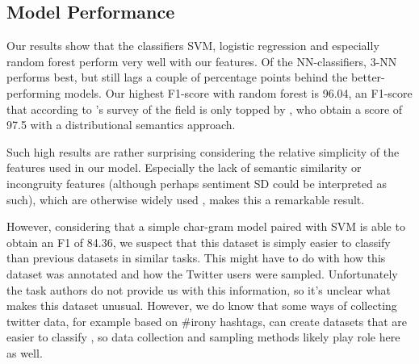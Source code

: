 \subsection{Model Performance}

Our results show that the classifiers SVM, logistic regression and especially random forest perform very well with our features. Of the NN-classifiers, 3-NN performs best, but still lags a couple of percentage points behind the better-performing models. Our highest F1-score with random forest is 96.04, an F1-score that according to 's survey of the field is only topped by , who obtain a score of 97.5 with a distributional semantics approach. 

Such high results are rather surprising considering the relative simplicity of the features used in our model. Especially the lack of semantic similarity or incongruity features (although perhaps sentiment SD could be interpreted as such), which are otherwise widely used \cite{reyes2012humor, riloff2013sarcasm, joshi2015harnessing, joshi2016word}, makes this a remarkable result.

However, considering that a simple char-gram model paired with SVM is able to obtain an F1 of 84.36, we suspect that this dataset is simply easier to classify than previous datasets in similar tasks. This might have to do with how this dataset was annotated and how the Twitter users were sampled. Unfortunately the task authors do not provide us with this information, so it's unclear what makes this dataset unusual. However, we do know that some ways of collecting twitter data, for example based on \#irony hashtags, can create datasets that are easier to classify \cite{sarcasm_detection}, so data collection and sampling methods likely play role here as well.

